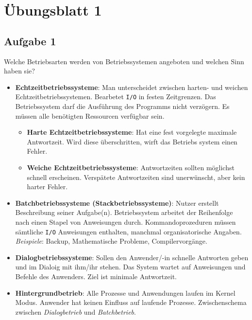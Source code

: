 \chapter{Übungsblatt 1}

\section{Aufgabe 1}

Welche Betriebsarten werden von Betriebssystemen angeboten und welchen Sinn
haben sie?

\begin{itemize}
    \item \textbf{Echtzeitbetriebssysteme}: Man unterscheidet zwischen harten- und
          weichen Echtzeitbetriebssystemen. Bearbetet \texttt{I/O} in festen Zeitgrenzen.
          Das Betriebssystem darf die Ausführung des Programms nicht verzögern. Es müssen
          alle benötigten Ressourcen verfügbar sein.
          \begin{itemize}
              \item \textbf{Harte Echtzeitbetriebssysteme}: Hat eine fest vorgelegte
                    maximale Antwortzeit. Wird diese überschritten, wirft das Betriebs\-
                    system einen Fehler.
              \item \textbf{Weiche Echtzeitbetriebssysteme}: Antwortzeiten sollten
                    möglichst schnell erscheinen. Verspätete Antwortzeiten sind unerwünscht,
                    aber kein harter Fehler.
          \end{itemize}
    \item \textbf{Batchbetriebssysteme (Stackbetriebssysteme)}: Nutzer erstellt
          Beschreibung seiner Aufgabe(n). Betriebssystem arbeitet der Reihenfolge nach
          einen Stapel von Anweisungen durch. Kommandoprozeduren müssen sämtliche
          \texttt{I/O} Anweisungen enthalten, manchmal organisatorische Angaben.
          \textit{Beispiele}: Backup, Mathematische Probleme, Compilervorgänge.
    \item \textbf{Dialogbetriebssysteme}: Sollen den Anwender/-in schnelle
          Antworten geben und im Dialoig mit ihm/ihr stehen. Das System wartet auf
          Anweisungen und Befehle des Anwenders. Ziel ist minimale Antwortzeit.
    \item \textbf{Hintergrundbetrieb}: Alle Prozesse und Anwendungen laufen
          im Kernel Modus. Anwender hat keinen Einfluss auf laufende Prozesse.
          Zwischenschema zwischen \textit{Dialogbetrieb} und \textit{Batchbetrieb}.
\end{itemize}

